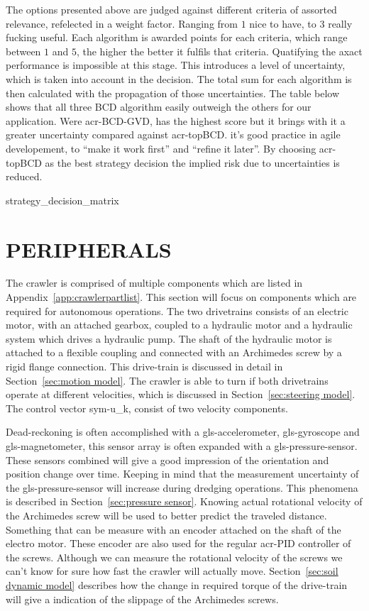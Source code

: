 The options presented above are judged against different criteria of assorted relevance, refelected in a weight factor.
Ranging from \( 1 \) nice to have, to \(  3 \) really fucking useful. Each algorithm is awarded points for each
criteria, which range between \( 1 \) and \( 5 \), the higher the better it fulfils that criteria. Quatifying the axact
performance is impossible at this stage. This introduces a level of uncertainty, which is taken into account in the
decision. The total sum for each algorithm is then calculated with the propagation of those uncertainties. The table
below shows that all three BCD algorithm easily outweigh the others for our application. Were \gls{acr-BCD-GVD}, has the
highest score but it brings with it a greater uncertainty compared against \gls{acr-topBCD}. it's good practice in
agile developement, to ``make it work first'' and ``refine it later''. By choosing \gls{acr-topBCD} as the best strategy
decision the implied risk due to uncertainties is reduced.

{strategy_decision_matrix}


\section{PERIPHERALS}\label{sec:peripherals}

The crawler is comprised of multiple components which are listed in Appendix~\ref{app:crawlerpartlist}. This section
will focus on components which are required for autonomous operations. The two drivetrains consists of an electric
motor, with an attached gearbox, coupled to a hydraulic motor and a hydraulic system which drives a hydraulic pump. The
shaft of the hydraulic motor is attached to a flexible coupling and connected with an Archimedes screw by a rigid flange
connection. This drive-train is discussed in detail in Section~\ref{sec:motion model}. The crawler is able to turn if
both drivetrains operate at different velocities, which is discussed in Section~\ref{sec:steering model}. The control
vector \gls{sym-u_k}, consist of two velocity components.

Dead-reckoning is often accomplished with a \gls{gls-accelerometer}, \gls{gls-gyroscope} and \gls{gls-magnetometer},
this sensor array is often expanded with a \gls{gls-pressure-sensor}. These sensors combined will give a good impression
of the orientation and position change over time. Keeping in mind that the measurement uncertainty of the
\gls{gls-pressure-sensor} will increase during dredging operations. This phenomena is described in
Section~\ref{sec:pressure sensor}. Knowing actual rotational velocity of the Archimedes screw will be used to better
predict the traveled distance. Something that can be measure with an encoder attached on the shaft of the electro motor.
These encoder are also used for the regular \gls{acr-PID} controller of the screws. Although we can measure the
rotational velocity of the screws we can't know for sure how fast the crawler will actually move. Section~\ref{sec:soil
dynamic model} describes how the change in required torque of the drive-train will give a indication of the slippage of
the Archimedes screws.


